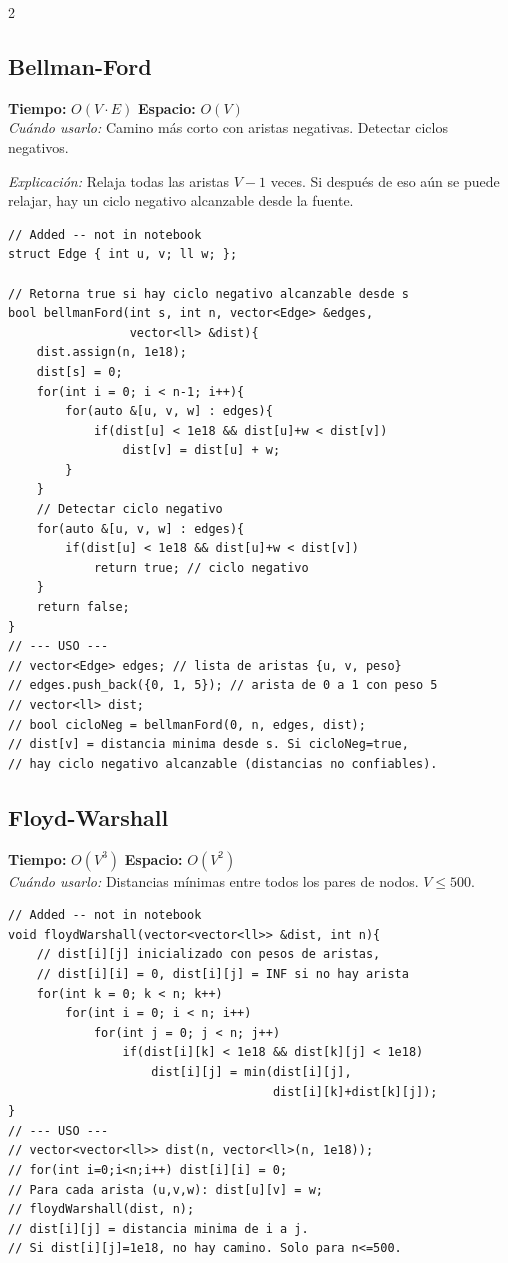 \documentclass[10pt,a4paper]{article}
\begin{document}
\begin{multicols}{2}
\subsection{Bellman-Ford}
\textbf{Tiempo:} $O(V \cdot E)$ \quad \textbf{Espacio:} $O(V)$\\
\textit{Cu\'ando usarlo:} Camino m\'as corto con aristas negativas. Detectar ciclos negativos.

\textit{Explicación:} Relaja todas las aristas $V-1$ veces. Si después de eso aún se puede relajar, hay un ciclo negativo alcanzable desde la fuente.

\begin{lstlisting}
// Added -- not in notebook
struct Edge { int u, v; ll w; };

// Retorna true si hay ciclo negativo alcanzable desde s
bool bellmanFord(int s, int n, vector<Edge> &edges,
                 vector<ll> &dist){
    dist.assign(n, 1e18);
    dist[s] = 0;
    for(int i = 0; i < n-1; i++){
        for(auto &[u, v, w] : edges){
            if(dist[u] < 1e18 && dist[u]+w < dist[v])
                dist[v] = dist[u] + w;
        }
    }
    // Detectar ciclo negativo
    for(auto &[u, v, w] : edges){
        if(dist[u] < 1e18 && dist[u]+w < dist[v])
            return true; // ciclo negativo
    }
    return false;
}
// --- USO ---
// vector<Edge> edges; // lista de aristas {u, v, peso}
// edges.push_back({0, 1, 5}); // arista de 0 a 1 con peso 5
// vector<ll> dist;
// bool cicloNeg = bellmanFord(0, n, edges, dist);
// dist[v] = distancia minima desde s. Si cicloNeg=true,
// hay ciclo negativo alcanzable (distancias no confiables).
\end{lstlisting}

\subsection{Floyd-Warshall}
\textbf{Tiempo:} $O(V^3)$ \quad \textbf{Espacio:} $O(V^2)$\\
\textit{Cu\'ando usarlo:} Distancias m\'inimas entre todos los pares de nodos. $V \leq 500$.

\begin{lstlisting}
// Added -- not in notebook
void floydWarshall(vector<vector<ll>> &dist, int n){
    // dist[i][j] inicializado con pesos de aristas,
    // dist[i][i] = 0, dist[i][j] = INF si no hay arista
    for(int k = 0; k < n; k++)
        for(int i = 0; i < n; i++)
            for(int j = 0; j < n; j++)
                if(dist[i][k] < 1e18 && dist[k][j] < 1e18)
                    dist[i][j] = min(dist[i][j],
                                     dist[i][k]+dist[k][j]);
}
// --- USO ---
// vector<vector<ll>> dist(n, vector<ll>(n, 1e18));
// for(int i=0;i<n;i++) dist[i][i] = 0;
// Para cada arista (u,v,w): dist[u][v] = w;
// floydWarshall(dist, n);
// dist[i][j] = distancia minima de i a j.
// Si dist[i][j]=1e18, no hay camino. Solo para n<=500.
\end{lstlisting}


\end{multicols}
\end{document}
